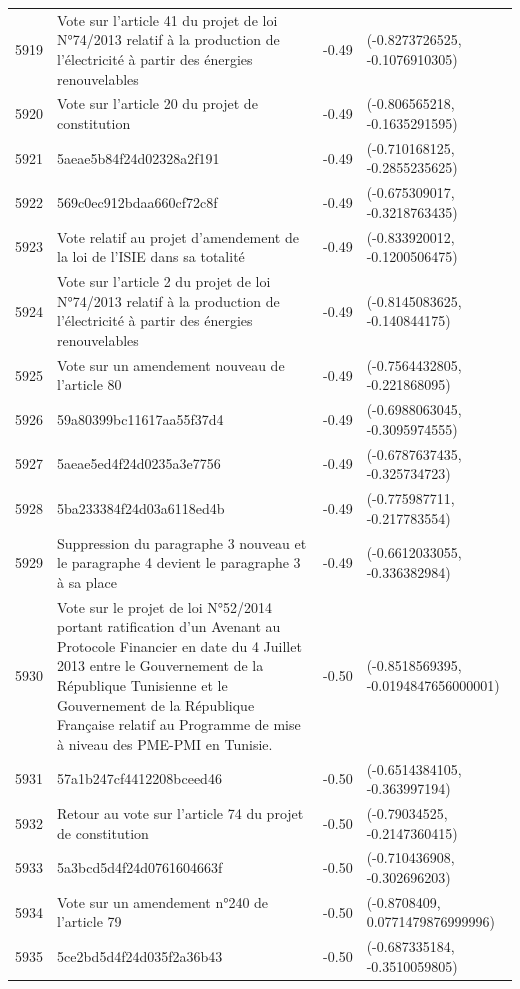 \begin{table}[ht]
\begin{tabular}{rlrl}
  5919 & Vote sur l'article 41 du projet de loi N°74/2013 relatif à la production de l'électricité à partir des énergies renouvelables & -0.49 & (-0.8273726525, -0.1076910305) \\ 
  5920 & Vote sur l'article 20 du projet de constitution & -0.49 & (-0.806565218, -0.1635291595) \\ 
  5921 & 5aeae5b84f24d02328a2f191 & -0.49 & (-0.710168125, -0.2855235625) \\ 
  5922 & 569c0ec912bdaa660cf72c8f & -0.49 & (-0.675309017, -0.3218763435) \\ 
  5923 & Vote relatif au projet d'amendement de la loi de l'ISIE dans sa totalité & -0.49 & (-0.833920012, -0.1200506475) \\ 
  5924 & Vote sur l'article 2 du projet de loi N°74/2013 relatif à la production de l'électricité à partir des énergies renouvelables & -0.49 & (-0.8145083625, -0.140844175) \\ 
  5925 & Vote sur un amendement nouveau de l'article 80 & -0.49 & (-0.7564432805, -0.221868095) \\ 
  5926 & 59a80399bc11617aa55f37d4 & -0.49 & (-0.6988063045, -0.3095974555) \\ 
  5927 & 5aeae5ed4f24d0235a3e7756 & -0.49 & (-0.6787637435, -0.325734723) \\ 
  5928 & 5ba233384f24d03a6118ed4b & -0.49 & (-0.775987711, -0.217783554) \\ 
  5929 & Suppression du paragraphe 3 nouveau et le paragraphe 4 devient le paragraphe 3 à sa place & -0.49 & (-0.6612033055, -0.336382984) \\ 
  5930 & Vote sur le projet de loi N°52/2014 portant ratification d’un Avenant au Protocole Financier en date du 4 Juillet 2013 entre le Gouvernement de la République Tunisienne et le Gouvernement de la République Française relatif au Programme de mise à niveau des PME-PMI en Tunisie. & -0.50 & (-0.8518569395, -0.0194847656000001) \\ 
  5931 & 57a1b247cf4412208bceed46 & -0.50 & (-0.6514384105, -0.363997194) \\ 
  5932 & Retour au vote sur l'article 74 du projet de constitution & -0.50 & (-0.79034525, -0.2147360415) \\ 
  5933 & 5a3bcd5d4f24d0761604663f & -0.50 & (-0.710436908, -0.302696203) \\ 
  5934 & Vote sur un amendement n°240 de l'article 79 & -0.50 & (-0.8708409, 0.0771479876999996) \\ 
  5935 & 5ce2bd5d4f24d035f2a36b43 & -0.50 & (-0.687335184, -0.3510059805) \\ 

\end{tabular}
\end{table}
